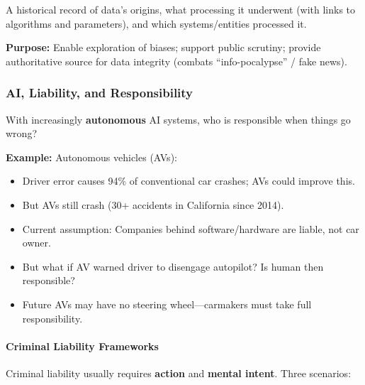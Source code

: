 \begin{defbox}
A historical record of data's origins, what processing it underwent (with links to algorithms and parameters), and which systems/entities processed it.

\textbf{Purpose:} Enable exploration of biases; support public scrutiny; provide authoritative source for data integrity (combats ``info-pocalypse'' / fake news).
\end{defbox}

\bigseparator

\subsubsection{AI, Liability, and Responsibility}

\begin{keybox}
With increasingly \textbf{autonomous} AI systems, who is responsible when things go wrong?

\textbf{Example:} Autonomous vehicles (AVs):
\begin{itemize}
  \item Driver error causes 94\% of conventional car crashes; AVs could improve this.
  \item But AVs still crash (30+ accidents in California since 2014).
  \item Current assumption: Companies behind software/hardware are liable, not car owner.
  \item But what if AV warned driver to disengage autopilot? Is human then responsible?
  \item Future AVs may have no steering wheel---carmakers must take full responsibility.
\end{itemize}
\end{keybox}

\separator

\paragraph*{Criminal Liability Frameworks}

Criminal liability usually requires \textbf{action} and \textbf{mental intent}. Three scenarios:


